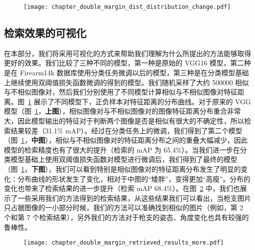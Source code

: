 \begin{figure}[t]
	\centering
  \captionsetup{justification=centering}
	\texttt{[image: chapter\_double\_margin\_dist\_distribution\_change.pdf]}
	\label{fig:feat_dist_distribution_change}
\end{figure}

\subsection{检索效果的可视化}
在本部分，我们将采用可视化的方式来帮助我们理解为什么所提出的方法能够取得更好的效果。我们比较了三种不同的模型，第一种是原始的 VGG16 模型，第二种是在 Firearm14k 数据库使用分类任务微调以后的模型，第三种是在分类模型基础上继续使用双阈值损失函数微调的得到的模型。我们随机采样了大约 500000 相似与不相似图像对，然后我们分别使用了不同模型计算相似与不相似图像对特征距离。图~\ref{fig:feat_dist_distribution_change} 展示了不同模型下，正负样本对特征距离的分布曲线。对于原来的 VGG 模型（图~\ref{fig:feat_dist_distribution_change}，\textbf{上图}），相似图像对与不相似图像对的图像特征距离分布重合非常大，因此模型输出的特征对于判断两个图像是否是相似有很大的不确定性，所以检索结果较差（31.1\% mAP）。经过在分类任务上的微调，我们得到了第二个模型（图~\ref{fig:feat_dist_distribution_change}，\textbf{中图}），相似与不相似图像对的特征距离分布之间的重叠大幅减少，因此模型的检索精度也有了很大的提升（检索的 mAP 为 65.4\%）。当我们进一步在分类模型基础上使用双阈值损失函数对模型进行微调后，我们得到了最终的模型（图~\ref{fig:feat_dist_distribution_change}，\textbf{下图}），我们可以看到特别是相似图像对的特征距离分布发生了明显的变化：分布曲线的形状发生了变化，相对于中图的“矮胖”，变得更加“高瘦”。分布的变化也带来了检索结果的进一步提升（检索 mAP 68.4\%）。在图~\ref{fig:double_margin_retrieval_result} 中，我们也展示了一些采用我们的方法得到的检索结果，从这些结果我们可以看出，当枪支图片只占据图像的一小部分时候，我们的方法可以准确找到相似的图片（例如，第 2 个和第 7 个检索结果），另外我们的方法对于枪支的姿态、角度变化也具有较强的鲁棒性。

\begin{figure}[t]
	\centering
	\texttt{[image: chapter\_double\_margin\_retrieved\_results\_more.pdf]}
	\label{fig:double_margin_retrieval_result}
\end{figure}


